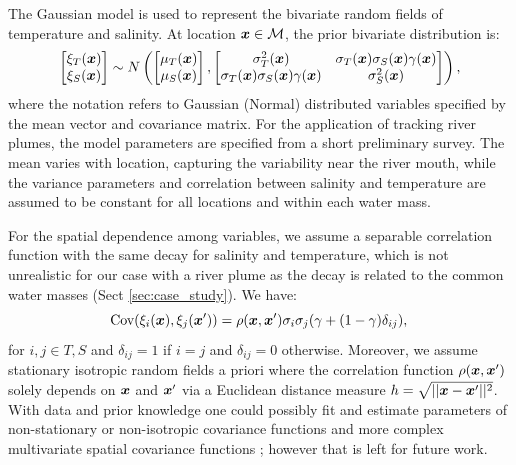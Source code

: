 \documentclass[aoas]{imsart}
\begin{document}
The Gaussian model is used to represent the bivariate random fields of temperature and salinity. At location ${\boldsymbol x} \in \mathcal{M}$, the prior bivariate distribution is:
\begin{equation}\label{gp_bar}
  \begin{bmatrix}\xi_T(\bx) \\
    \xi_S(\bx) \end{bmatrix}
 \sim N \left( 
\begin{bmatrix} \mu_{T}(\bx)\\
\mu_{S}(\bx)
\end{bmatrix},\begin{bmatrix}
\sigma_{T}^2(\bx) & \sigma_{T}(\bx) \sigma_S(\bx) \gamma(\bx)  \\
\sigma_{T}(\bx) \sigma_S(\bx) \gamma(\bx)  & \sigma_{S}^2(\bx) 
\end{bmatrix}
\right),
\end{equation}
where the notation refers to Gaussian (Normal) distributed variables
specified by the mean vector and covariance matrix. For the application
of tracking river plumes, the model parameters are specified from a short preliminary survey. The mean varies with location, capturing the variability near the river mouth, while the variance parameters and correlation between salinity and temperature are assumed to be constant for all locations and within each water mass. 

For the spatial dependence among variables, we assume a separable correlation function with the same decay for salinity and temperature,
which is not unrealistic for our case with a river plume as the decay is related to the common water masses (Sect \ref{sec:case_study}). We have:
\begin{equation}\label{gp_corr}
\mbox{Cov}(\xi_i(\bx),\xi_j(\bx')) = \rho(\bx,\bx') \sigma_i \sigma_j (\gamma +(1-\gamma )\delta_{ij}), \\
\end{equation}
for $i,j \in {T,S}$ and $\delta_{ij}=1$ if $i=j$ and $\delta_{ij}=0$
otherwise. Moreover, we assume stationary isotropic random fields a priori where the
correlation function $\rho({\boldsymbol x},{\boldsymbol x}')$ solely depends on ${\boldsymbol x}$ and
${\boldsymbol x}'$ via a Euclidean distance measure $h=\sqrt{||{\boldsymbol x}-{\boldsymbol x}'||^2}$. With
data and prior knowledge one could possibly fit and estimate
parameters of non-stationary or non-isotropic covariance functions and
more complex multivariate spatial covariance functions
\citep{gneiting2010matern,genton2015cross}; however that is left for
future work.
\end{document}
